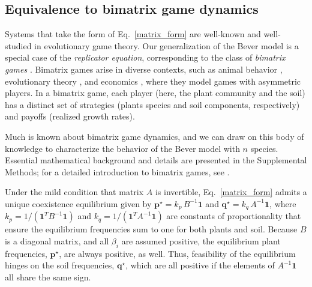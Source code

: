 \documentclass[11pt]{article}
\begin{document}
\subsection{Equivalence to bimatrix game dynamics}

Systems that take the form of Eq.~\ref{matrix_form} are well-known and well-studied in evolutionary game theory. Our generalization of the Bever model is a special case of the \emph{replicator equation}, corresponding to the class of \emph{bimatrix games} \citep{taylor1979evolutionarily,hofbauer1996evolutionary,hofbauer1998evolutionary,cressman2014replicator}. Bimatrix games arise in diverse contexts, such as animal behavior \citep{taylor1979evolutionarily,selten1988note}, evolutionary theory \citep{hofbauer1998evolutionary,cressman2014replicator}, and economics \citep{friedman1991evolutionary}, where they model games with asymmetric players. In a bimatrix game, each player (here, the plant community and the soil) has a distinct set of strategies (plants species and soil components, respectively) and payoffs (realized growth rates).

Much is known about bimatrix game dynamics, and we can draw on this body of knowledge to characterize the behavior of the Bever model with $n$ species. Essential mathematical background and details are presented in the Supplemental Methods; for a detailed introduction to bimatrix games, see \citet{hofbauer1998evolutionary}.

Under the mild condition that matrix $A$ is invertible, Eq.~\ref{matrix_form} admits a unique coexistence equilibrium given by $\bm{p}^\star = k_p \, B^{-1} \bm{1}$ and $\bm{q}^\star = k_q \, A^{-1} \bm{1}$, where $k_p = 1 / (\bm{1}^T B^{-1} \bm{1})$ and $k_q = 1 / (\bm{1}^T A^{-1} \bm{1})$ are constants of proportionality that ensure the equilibrium frequencies sum to one for both plants and soil. Because $B$ is a diagonal matrix, and all $\beta_i$ are assumed positive, the equilibrium plant frequencies, $\bm{p}^\star$, are always positive, as well. Thus, feasibility of the equilibrium hinges on the soil frequencies, $\bm{q}^\star$, which are all positive if the elements of $A^{-1} \bm{1}$ all share the same sign.
\end{document}
